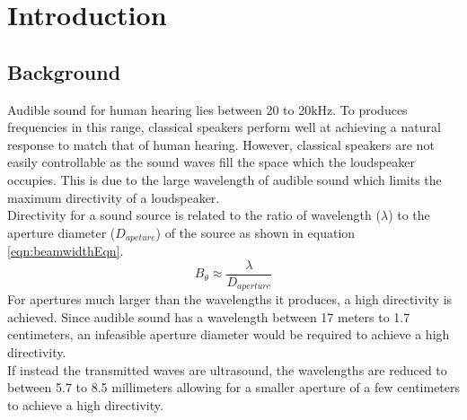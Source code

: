 \section{Introduction}
\subsection{Background}
Audible sound for human hearing lies between 20 to 20kHz. To produces frequencies in this range, classical speakers perform well at achieving a natural response to match that of human hearing. However, classical speakers are not easily controllable as the sound waves fill the space which the loudspeaker occupies. This is due to the large wavelength of audible sound which limits the maximum directivity of a loudspeaker.\\
Directivity for a sound source is related to the ratio of wavelength ($\lambda$) to the aperture diameter ($D_{apeture}$) of the source as shown in equation \ref{eqn:beamwidthEqn}.
\begin{equation}
    B_\theta \approx \frac{\lambda}{D_{aperture}}
    \label{eqn:beamwidthEqn}
\end{equation}
For apertures much larger than the wavelengths it produces, a high directivity is achieved. Since audible sound has a wavelength between 17 meters to 1.7 centimeters, an infeasible aperture diameter would be required to achieve a high directivity.\\
If instead the transmitted waves are ultrasound, the wavelengths are reduced to between 5.7 to 8.5 millimeters allowing for a smaller aperture of a few centimeters to achieve a high directivity.
